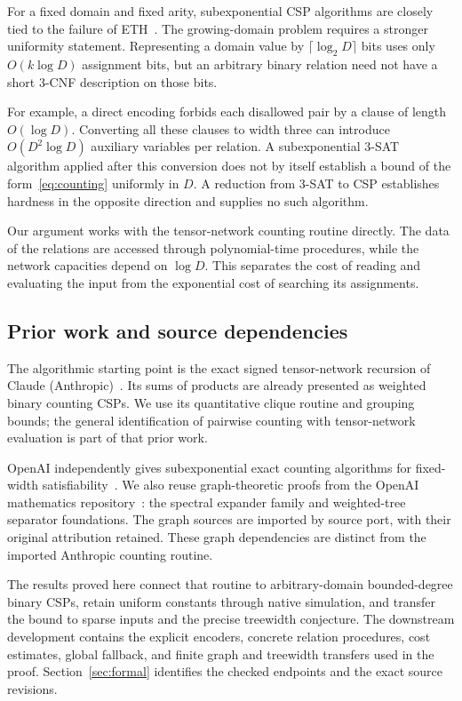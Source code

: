 \documentclass[11pt,reqno]{amsart}
\numberwithin{equation}{section}
\theoremstyle{definition}
\theoremstyle{remark}
\begin{document}
For a fixed domain and fixed arity, subexponential CSP algorithms are closely tied to the failure of ETH~\cite{KS13}. The growing-domain problem requires a stronger uniformity statement. Representing a domain value by $\lceil\log_2D\rceil$ bits uses only $O(k\log D)$ assignment bits, but an arbitrary binary relation need not have a short $3$-CNF description on those bits.

For example, a direct encoding forbids each disallowed pair by a clause of length $O(\log D)$. Converting all these clauses to width three can introduce $O(D^2\log D)$ auxiliary variables per relation. A subexponential $3$-SAT algorithm applied after this conversion does not by itself establish a bound of the form~\eqref{eq:counting} uniformly in $D$. A reduction from $3$-SAT to CSP establishes hardness in the opposite direction and supplies no such algorithm.

Our argument works with the tensor-network counting routine directly. The data of the relations are accessed through polynomial-time procedures, while the network capacities depend on $\log D$. This separates the cost of reading and evaluating the input from the exponential cost of searching its assignments.

\subsection{Prior work and source dependencies}\label{sec:prior}

The algorithmic starting point is the exact signed tensor-network recursion of Claude (Anthropic)~\cite{ClaudeETH,AnthropicLean}. Its sums of products are already presented as weighted binary counting CSPs. We use its quantitative clique routine and grouping bounds; the general identification of pairwise counting with tensor-network evaluation is part of that prior work.

OpenAI independently gives subexponential exact counting algorithms for fixed-width satisfiability~\cite{OpenAIETH}. We also reuse graph-theoretic proofs from the OpenAI mathematics repository~\cite{OpenAIGraph}: the spectral expander family and weighted-tree separator foundations. The graph sources are imported by source port, with their original attribution retained. These graph dependencies are distinct from the imported Anthropic counting routine.

The results proved here connect that routine to arbitrary-domain bounded-degree binary CSPs, retain uniform constants through native simulation, and transfer the bound to sparse inputs and the precise treewidth conjecture. The downstream development contains the explicit encoders, concrete relation procedures, cost estimates, global fallback, and finite graph and treewidth transfers used in the proof. Section~\ref{sec:formal} identifies the checked endpoints and the exact source revisions.
\end{document}
